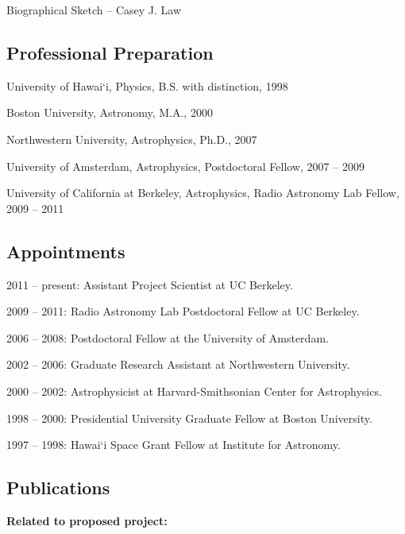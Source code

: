 \documentclass[11pt]{article}
\begin{document}
\thispagestyle{empty}

\begin{center}
\Large{Biographical Sketch -- Casey J. Law}
\end{center}

\subsection*{Professional Preparation}
\indent 

University of Hawai`i, Physics, B.S. with distinction, 1998

Boston University, Astronomy, M.A., 2000

Northwestern University, Astrophysics, Ph.D., 2007

University of Amsterdam, Astrophysics, Postdoctoral Fellow, 2007 -- 2009

University of California at Berkeley, Astrophysics, Radio Astronomy Lab Fellow, 2009 -- 2011

\subsection*{Appointments}
\indent

2011 -- present:  Assistant Project Scientist at UC Berkeley.

2009 -- 2011:  Radio Astronomy Lab Postdoctoral Fellow at UC Berkeley.

2006 -- 2008:  Postdoctoral Fellow at the University of Amsterdam.

2002 -- 2006:  Graduate Research Assistant at Northwestern University.

2000 -- 2002:  Astrophysicist at Harvard-Smithsonian Center for Astrophysics.

1998 -- 2000:  Presidential University Graduate Fellow at Boston University.

1997 -- 1998:  Hawai`i Space Grant Fellow at Institute for Astronomy.

\subsection*{Publications}
\indent

{\bf Related to proposed project:}
\end{document}
